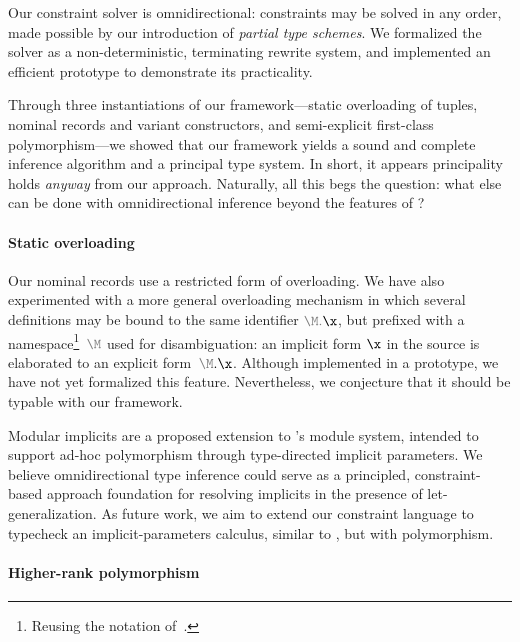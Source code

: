 \documentclass[acmsmall,screen,nonacm,review]{acmart}
\begin{document}
Our constraint solver is omnidirectional: constraints may be solved in any
order, made possible by our introduction of \emph{partial type schemes}.
We formalized the solver as a non-deterministic, terminating rewrite system,
and implemented an efficient prototype to demonstrate its practicality.

Through three instantiations of our framework---static overloading of
tuples, nominal records and variant constructors, and semi-explicit
first-class polymorphism---we showed that our framework yields a sound and
complete inference algorithm and a principal type system. In short, it
appears principality holds \emph{anyway} from our approach.
%
Naturally, all this begs the question: what else can be done with
omnidirectional inference beyond the features of \OML?


\paragraph{Static overloading}

Our nominal records use a restricted form of overloading.  We have also
experimented with a more general overloading mechanism in which several
definitions may be bound to the same identifier ${\color{gray}\M.}\x$, but
prefixed with a namespace\footnote {Reusing the notation
of~\citet*{Leijen-Ye/prefix@pldi2025}.}~$\color{gray}\M$ used for
disambiguation: an implicit form $\x$ in the source is elaborated to an
explicit form~$\exover {{\color{gray}\M}} \x$.
%
Although implemented in a prototype, we have not yet
formalized this feature.  Nevertheless, we conjecture
that it should be typable with our framework.

Modular implicits \citep*{White-Bour-Yallop/Modular_Implicits/ml2014} are a
proposed extension to \OCaml's module system, intended to support ad-hoc
polymorphism through type-directed implicit parameters. We believe
omnidirectional type inference could serve as a principled, constraint-based
approach foundation for resolving implicits in the presence of
let-generalization.
%
As future work, we aim to extend our constraint language to typecheck an
implicit-parameters calculus, similar to \COCHIS
\citep*{journals/jfp/SchrijversOWM19}, but with \ML polymorphism.


\paragraph{Higher-rank polymorphism}
\end{document}
